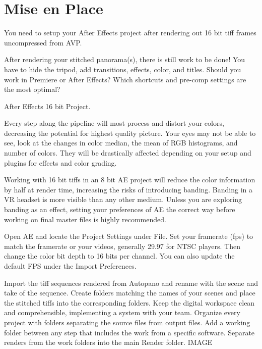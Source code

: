 \chapter{Mise en Place}
\pagecolor{white}
\label{chap:47}
\begin{fullwidth}

\problem

{\large You need to setup your After Effects project after rendering out 16 bit tiff frames uncompressed from AVP. \par}

After rendering your stitched panorama(s), there is still work to be done! You have to hide the tripod, add transitions, effects, color, and titles. Should you work in Premiere or After Effects? Which shortcuts and pre-comp settings are the most optimal?

\solutions

{\large After Effects 16 bit Project. \par}

Every step along the pipeline will most process and distort your colors, decreasing the potential for highest quality picture. Your eyes may not be able to see, look at the changes in color median, the mean of RGB histograms, and number of colors. They will be drastically affected depending on your setup and plugins for effects and color grading.

Working with 16 bit tiffs in an 8 bit AE project will reduce the color information by half at render time, increasing the risks of introducing banding. Banding in a VR headset is more visible than any other medium. Unless you are exploring banding as an effect, setting your preferences of AE the correct way before working on final master files is highly recommended. 

Open AE and locate the Project Settings under File. Set your framerate (fps) to match the framerate or your videos, generally 29.97 for NTSC players. Then change the color bit depth to 16 bits per channel. You can also update the default FPS under the Import Preferences.

Import the tiff sequences rendered from Autopano and rename with the scene and take of the sequence. Create folders matching the names of your scenes and place the stitched tiffs into the corresponding folders. Keep the digital workspace clean and comprehensible, implementing a system with your team. Organize every project with folders separating the source files from output files. Add a working folder between any step that includes the work from a specific software. Separate renders from the work folders into the main Render folder. 
IMAGE 


\end{fullwidth}
